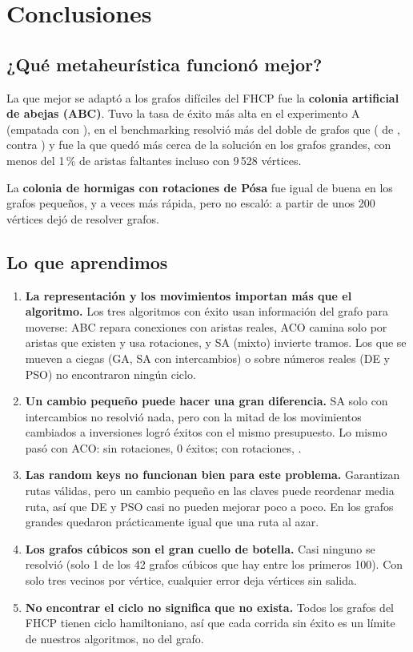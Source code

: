 \chapter{Conclusiones}
\label{cap:concl}

\section{¿Qué metaheurística funcionó mejor?}
La que mejor se adaptó a los grafos difíciles del FHCP fue la \textbf{colonia artificial de abejas
(ABC)}. Tuvo la tasa de éxito más alta en el experimento A (empatada con ),
en el benchmarking resolvió más del doble de grafos que 
(\resueltasBABC{} de \grafosB{}, contra \resueltasBACOposa) y fue la que quedó más cerca de la solución en los grafos grandes,
con menos del 1\,\% de aristas faltantes incluso con 9\,528 vértices.

La \textbf{colonia de hormigas con rotaciones de Pósa} fue igual de buena en los grafos pequeños,
y a veces más rápida, pero no escaló: a partir de unos 200 vértices dejó de resolver grafos.

\section{Lo que aprendimos}
\begin{enumerate}
  \item \textbf{La representación y los movimientos importan más que el algoritmo.} Los tres
        algoritmos con éxito usan información del grafo para moverse: ABC repara conexiones con
        aristas reales, ACO camina solo por aristas que existen y usa rotaciones, y SA (mixto)
        invierte tramos. Los que se mueven a ciegas (GA, SA con intercambios) o sobre números
        reales (DE y PSO) no encontraron ningún ciclo.
  \item \textbf{Un cambio pequeño puede hacer una gran diferencia.} SA solo con intercambios no
        resolvió nada, pero con la mitad de los movimientos cambiados a inversiones logró
        \exitosASA{} éxitos con el mismo presupuesto. Lo mismo pasó con ACO: sin rotaciones, 0
        éxitos; con rotaciones, \exitosAACOposa.
  \item \textbf{Las random keys no funcionan bien para este problema.} Garantizan rutas válidas,
        pero un cambio pequeño en las claves puede reordenar media ruta, así que DE y PSO casi no
        pueden mejorar poco a poco. En los grafos grandes quedaron prácticamente igual que una
        ruta al azar.
  \item \textbf{Los grafos cúbicos son el gran cuello de botella.} Casi ninguno se resolvió
        (solo 1 de los 42 grafos cúbicos que hay entre los primeros 100). Con solo tres vecinos por vértice, cualquier error
        deja vértices sin salida.
  \item \textbf{No encontrar el ciclo no significa que no exista.} Todos los grafos del FHCP
        tienen ciclo hamiltoniano, así que cada corrida sin éxito es un límite de nuestros
        algoritmos, no del grafo.
\end{enumerate}

